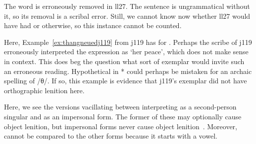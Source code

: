 \begin{mwl}
\end{mwl}
The word  is erroneously removed in \gls{ll27}. The sentence is ungrammatical without it, so its removal is a scribal error. Still, we cannot know now whether \gls{ll27} would have had  or  otherwise, so this instance cannot be counted.

\begin{mwl}
\end{mwl}
Here, Example~\ref{ex:thangneuedj119} from \gls{j119} has  for . Perhaps the scribe of \gls{j119} erroneously interpreted the expression as `her peace', which does not make sense in context. This does beg the question what sort of exemplar would invite such an erroneous reading. Hypothetical  in * could perhaps be mistaken for an archaic spelling of /θ/. If so, this example is evidence that \gls{j119}'s exemplar did not have orthographic lenition here.

\begin{mwl}
\end{mwl}
Here, we see the versions vacillating between interpreting  as a second-person singular and as an impersonal form. The former of these may optionally cause object lenition, but impersonal forms never cause object lenition~\autocite{van_development14}. Moreover,  cannot be compared to the other forms because it starts with a vowel.

